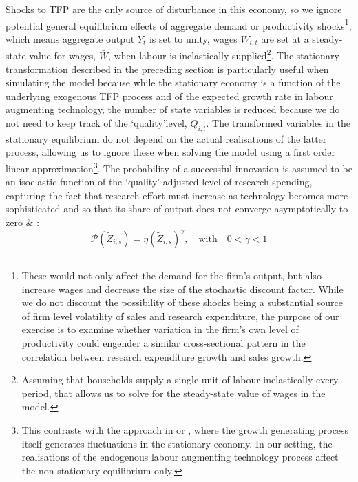 \documentclass{_latex/house}
\begin{document}
Shocks to TFP are the only source of disturbance in this economy, so we ignore potential general equilibrium effects of aggregate demand or productivity shocks\footnote{These would not only affect the demand for the firm's output, but also increase wages and decrease the size of the stochastic discount factor. While we do not discount the possibility of these shocks being a substantial source of firm level volatility of sales and research expenditure, the purpose of our exercise is to examine whether variation in the firm's own level of productivity could engender a similar cross-sectional pattern in the correlation between research expenditure growth and sales growth.}, which means aggregate output $Y_{t}$ is set to unity, wages $W_{i,t}$ are set at a steady-state value for wages, $\bar{W}$, when labour is inelastically supplied\footnote{Assuming that households supply a single unit of labour inelastically every period, that allows us to solve for the steady-state value of wages in the model.}. The stationary transformation described in the preceding section is particularly useful when simulating the model because while the stationary economy is a function of the underlying exogenous TFP process and of the expected growth rate in labour augmenting technology, the number of state variables is reduced because we do not need to keep track of the \textquoteleft quality\textquoteright\:level, $Q_{i,t}$. The transformed variables in the stationary equilibrium do not depend on the actual realisations of the latter process, allowing us to ignore these when solving the model using a first order linear approximation\footnote{This contrasts with the approach in \cite{RePEc:cup:macdyn:v:8:y:2004:i:05:p:559-581_04} or \cite{RePEc:eee:dyncon:v:30:y:2006:i:11:p:1885-1913}, where the growth generating process itself generates fluctuations in the stationary economy. In our setting, the realisations of the endogenous labour augmenting technology process affect the non-stationary equilibrium only.}. The probability of a successful innovation is assumed to be an isoelastic function of the \textquoteleft quality\textquoteright-adjusted level of research spending, capturing the fact that research effort must increase as technology becomes more sophisticated and so that its share of output does not converge asymptotically to zero \cite{RePEc:ecm:emetrp:v:65:y:1997:i:6:p:1389-1420} \& \cite{RePEc:cla:levrem:122247000000001721}:
\begin{equation}
\mathcal{P}\left(\tilde{Z}_{i,s} \right)=\eta \left(\tilde{Z}_{i,s} \right)^{\gamma}, \quad\text{with}\quad 0<\gamma<1 \label{equation9}
\end{equation}
\end{document}
